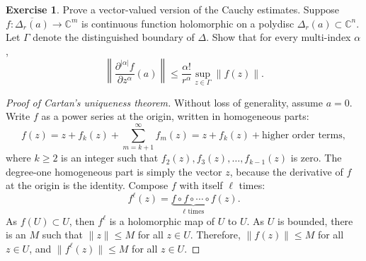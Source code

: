 \documentclass[12pt,openany]{book}
\newcommand{\snorm}[1]{\lVert {#1} \rVert}
\newcommand{\abs}[1]{\left\lvert {#1} \right\rvert}
\newcommand{\norm}[1]{\left\lVert {#1} \right\rVert}
\newcommand{\C}{{\mathbb{C}}}
\theoremstyle{plain}
\theoremstyle{remark}
\theoremstyle{definition}
\newenvironment{exbox}{%
    \def\FrameCommand{\vrule width 1pt \relax\hspace{10pt}}%
    \MakeFramed{\advance\hsize-\width\FrameRestore}%
}{%
    \endMakeFramed
}
\theoremstyle{exercise}
\newtheorem{exercise}{Exercise}[section]
\theoremstyle{example}
\begin{document}
\begin{exbox}
\begin{exercise}
Prove a vector-valued version of the Cauchy estimates.  Suppose $f
\colon \overline{\Delta_r(a)} \to \C^m$ is continuous function holomorphic
on a polydisc $\Delta_r(a) \subset \C^n$.  Let $\Gamma$ denote the distinguished
boundary of $\Delta$.  Show that for every multi-index $\alpha$,
\begin{equation*}
\norm{\frac{\partial^{\abs{\alpha}}f}{\partial z^\alpha} (a)}
\leq
\frac{\alpha!}{r^\alpha} \sup_{z\in \Gamma} \norm{f(z)} .
\end{equation*}
\end{exercise}
\end{exbox}



\begin{proof}[Proof of Cartan's uniqueness theorem]
Without loss of generality, assume $a=0$.
Write $f$ as a power series at the origin, written in homogeneous parts:
\begin{equation*}
f(z) = z + f_k(z) + \sum_{m=k+1}^\infty f_m(z) = z + f_k(z) + \text{higher
order terms},
\end{equation*}
where $k \geq 2$ is an integer such that $f_2(z),f_3(z),\ldots,f_{k-1}(z)$ is zero.
The degree-one homogeneous part is simply the vector $z$,
because
the derivative of $f$ at the origin is the identity.
Compose $f$ with itself $\ell$ times:
\begin{equation*}
f^\ell(z) = \underbrace{f \circ f \circ \cdots \circ f}_{\ell\text{ times}}
(z) .
\end{equation*}
As $f(U) \subset U$, then $f^\ell$ is a holomorphic map
of $U$ to $U$.  As $U$ is bounded, there is an $M$ such that $\snorm{z} \leq
M$ for all $z \in U$.  Therefore, $\snorm{f(z)} \leq M$ for all $z \in U$, and
$\snorm{f^\ell(z)} \leq M$ for all $z \in U$.


\end{proof}
\end{document}
